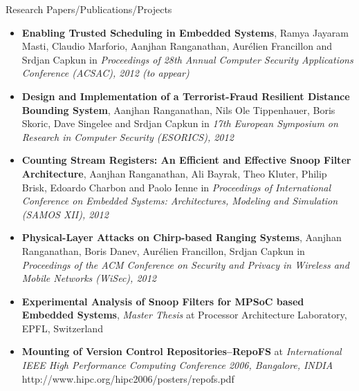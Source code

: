 \documentclass[11pt,oneside]{article}
\newenvironment{ressection}[1]{
	\vspace{4pt}
	{\fontfamily{phv}\selectfont\Large#1}
	\begin{itemize}
	\vspace{3pt}
}{
	\end{itemize}
}
\newcommand{\resitem}[1]{
	\vspace{-4pt}
	\item \begin{flushleft} #1 \end{flushleft}
}
\begin{document}


\begin{ressection}{Research Papers/Publications/Projects}

  \resitem{\textbf{Enabling Trusted Scheduling in Embedded Systems}, Ramya Jayaram
    Masti, Claudio Marforio, Aanjhan Ranganathan, Aur\'elien Francillon and
    Srdjan Capkun in \emph{Proceedings of 28th Annual Computer Security Applications
    Conference (ACSAC), 2012 (to appear)}}

        \resitem{\textbf{Design and Implementation of a Terrorist-Fraud Resilient
          Distance Bounding System}, Aanjhan Ranganathan, Nils Ole
          Tippenhauer, Boris Skoric, Dave Singelee and Srdjan Capkun in \emph{17th
          European Symposium on Research in Computer Security (ESORICS), 2012}}

        \resitem{\textbf{Counting Stream Registers: An Efficient and Effective Snoop
          Filter Architecture}, Aanjhan Ranganathan, Ali Bayrak, Theo Kluter,
          Philip Brisk, Edoardo Charbon and Paolo Ienne in \emph{Proceedings of
          International Conference on Embedded Systems: Architectures,
          Modeling and Simulation (SAMOS XII), 2012}}

        \resitem{\textbf{Physical-Layer Attacks on Chirp-based Ranging Systems},
          Aanjhan Ranganathan, Boris Danev, Aur\'elien Francillon, Srdjan
          Capkun in \emph{Proceedings of the ACM Conference on Security and Privacy
          in Wireless and Mobile Networks (WiSec), 2012}}

      \resitem{\textbf{Experimental Analysis of Snoop Filters for MPSoC based
          Embedded Systems}, \emph{Master Thesis} at Processor Architecture
        Laboratory, EPFL, Switzerland}
        
      \resitem{\textbf{Mounting of Version Control Repositories--RepoFS} at
        \emph{International IEEE High Performance Computing Conference 2006,
          Bangalore, INDIA} http://www.hipc.org/hipc2006/posters/repofs.pdf}
    

\end{ressection}
\end{document}
